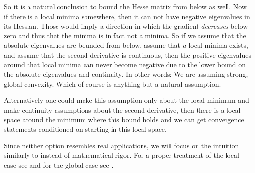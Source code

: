 So it is a natural conclusion to bound the Hesse matrix from below as well.
Now if there is a local minima somewhere, then it can not have negative
eigenvalues in its Hessian. Those would imply a direction in which the gradient
\emph{decreases} below zero and thus that the minima is in fact not a minima.
So if we assume that the absolute eigenvalues are bounded from below, assume
that \emph{a} local minima exists, and assume that the second derivative is
continuous, then the positive eigenvalues around that local minima can
never become negative due to the lower bound on the absolute eigenvalues and
continuity. In other words: We are assuming strong, global convexity. Which of
course is anything but a natural assumption.

Alternatively one could make this assumption only about the local minimum and
make continuity assumptions about the second derivative, then there is a local
space around the minimum where this bound holds and we can get convergence
statements conditioned on starting in this local space.

Since neither option resembles real applications, we will focus on the intuition
similarly to \textcite{gohWhyMomentumReally2017} instead of mathematical rigor.
For a proper treatment of the local case see \textcite[Theorem
1.2.4]{nesterovLecturesConvexOptimization2018} and for the global case see
\textcite[Theorem 2.1.15]{nesterovLecturesConvexOptimization2018}.



